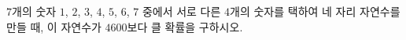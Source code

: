 $7$개의 숫자 $1$, $2$, $3$, $4$, $5$, $6$, $7$ 중에서 서로 다른 $4$개의 숫자를 택하여 네 자리 자연수를 만들 때, 이 자연수가 $4600$보다 클 확률을 구하시오.
